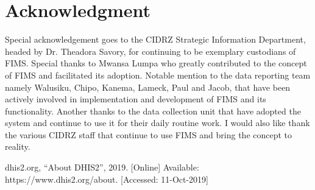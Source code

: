 \documentclass[conference]{IEEEtran}
\begin{document}
\section*{Acknowledgment}

Special acknowledgement goes to the CIDRZ Strategic Information Department, headed by Dr. Theadora Savory, for continuing to be exemplary custodians of FIMS. Special thanks to Mwansa Lumpa who greatly contributed to the concept of FIMS and facilitated its adoption.
Notable mention to the data reporting team namely Walusiku, Chipo, Kanema, Lameck, Paul and Jacob, that have been actively involved in implementation and development of FIMS and its functionality. Another thanks to the data collection unit that have adopted the system and continue to use it for their daily routine work. I would also like thank the various CIDRZ staff 
that continue to use FIMS and bring the concept to reality.

\begin{thebibliography}{00}
 dhis2.org, ``About DHIS2'', 2019. [Online] Available: https://www.dhis2.org/about. [Accessed: 11-Oct-2019]
\end{thebibliography}
\end{document}
